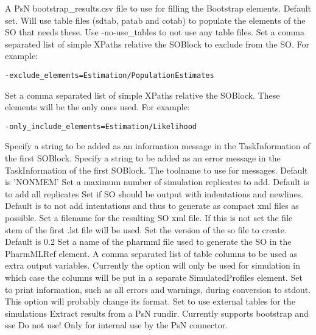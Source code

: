 \begin{optionlist}
A PsN bootstrap\_results.csv file to use for filling the Bootstrap elements.
\nextopt
{}
Default set. Will use table files (sdtab, patab and cotab) to populate the elements of the SO that needs these. Use -no-use\_tables to not use any table files.
\nextopt
{}
Set a comma separated list of simple XPaths relative the SOBlock to exclude from the SO.
For example:
\begin{verbatim}
-exclude_elements=Estimation/PopulationEstimates
\end{verbatim}
\nextopt
{}
Set a comma separated list of simple XPaths relative the SOBlock. These elements will be the only ones used.
For example: 
\begin{verbatim}
-only_include_elements=Estimation/Likelihood
\end{verbatim}
\nextopt
{}
Specify a string to be added as an information message in the TaskInformation of the first SOBlock.
\nextopt
{}
Specify a string to be added as an error message in the TaskInformation of the first SOBlock.
\nextopt
{}
The toolname to use for messages. Default is 'NONMEM'
\nextopt
{}
Set a maximum number of simulation replicates to add. Default is to add all replicates
\nextopt
{}
Set if SO should be output with indentations and newlines.
Default is to not add intentations and thus to generate as compact xml files as possible.
\nextopt
{}
Set a filename for the resulting SO xml file. If this is not set the file stem of the first .lst file will be used.
\nextopt
{}
Set the version of the so file to create. Default is 0.2
\nextopt
{}
Set a name of the pharmml file used to generate the SO
in the PharmMLRef element.
\nextopt
{}
A comma separated list of table columns to be used as extra output variables. Currently the option will only be used for simulation
in which case the columns will be put in a separate SimulatedProfiles element.
\nextopt
{}
Set to print information, such as all errors and warnings, during conversion to stdout.
\nextopt
{}
This option will probably change its format.
Set to use external tables for the simulations
\nextopt
{}
Extract results from a PsN rundir. Currently supports bootstrap and sse
\nextopt
{}
Do not use! Only for internal use by the PsN connector.
\nextopt
\end{optionlist}

